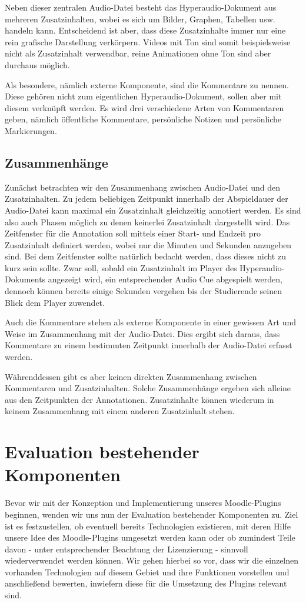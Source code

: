 Neben dieser zentralen Audio-Datei besteht das Hyperaudio-Dokument aus mehreren Zusatzinhalten, wobei es sich um Bilder, Graphen, Tabellen usw. handeln kann. Entscheidend ist aber, dass diese Zusatzinhalte immer nur eine rein grafische Darstellung verkörpern. Videos mit Ton sind somit beispielsweise nicht als Zusatzinhalt verwendbar, reine Animationen ohne Ton sind aber durchaus möglich.

Als besondere, nämlich externe Komponente, sind die Kommentare zu nennen. Diese gehören nicht zum eigentlichen Hyperaudio-Dokument, sollen aber mit diesem verknüpft werden. Es wird drei verschiedene Arten von Kommentaren geben, nämlich  öffentliche Kommentare, persönliche Notizen und persönliche Markierungen.

\subsection{Zusammenhänge}
Zunächst betrachten wir den Zusammenhang zwischen Audio-Datei und den Zusatzinhalten. Zu jedem beliebigen Zeitpunkt innerhalb der Abspieldauer der Audio-Datei kann maximal ein Zusatzinhalt gleichzeitig annotiert werden. Es sind also auch Phasen möglich zu denen keinerlei Zusatzinhalt dargestellt wird. Das Zeitfenster für die Annotation soll mittels einer Start- und Endzeit pro Zusatzinhalt definiert werden, wobei nur die Minuten und Sekunden anzugeben sind. Bei dem Zeitfenster sollte natürlich bedacht werden, dass dieses nicht zu kurz sein sollte. Zwar soll, sobald ein Zusatzinhalt im Player des Hyperaudio-Dokuments angezeigt wird,  ein entsprechender Audio Cue abgespielt werden, dennoch können bereits einige Sekunden vergehen bis der Studierende seinen Blick dem Player zuwendet.

Auch die Kommentare stehen als externe Komponente in einer gewissen Art und Weise im Zusammenhang mit der Audio-Datei. Dies ergibt sich daraus, dass Kommentare zu einem bestimmten Zeitpunkt innerhalb der Audio-Datei erfasst werden.

Währenddessen gibt es aber keinen direkten Zusammenhang zwischen Kommentaren und Zusatzinhalten. Solche Zusammenhänge ergeben sich alleine aus den Zeitpunkten der Annotationen. Zusatzinhalte können wiederum in keinem Zusammenhang mit einem anderen Zusatzinhalt stehen.

\section{Evaluation bestehender Komponenten}
Bevor wir mit der Konzeption und Implementierung unseres Moodle-Plugins beginnen, wenden wir uns nun der Evaluation bestehender Komponenten zu. Ziel ist es festzustellen, ob eventuell bereits Technologien existieren, mit deren Hilfe unsere Idee des Moodle-Plugins umgesetzt werden kann oder ob zumindest Teile davon - unter entsprechender Beachtung der Lizenzierung - sinnvoll wiederverwendet werden können. Wir gehen hierbei so vor, dass wir die einzelnen vorhanden Technologien auf diesem Gebiet und ihre Funktionen vorstellen und anschließend bewerten, inwiefern diese für die Umsetzung des Plugins relevant sind.

